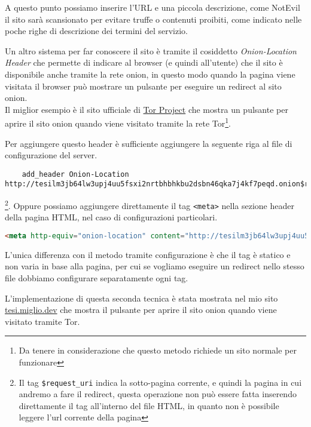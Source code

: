 A questo punto possiamo inserire l'URL e una piccola descrizione, come NotEvil il sito sarà scansionato per evitare truffe o contenuti proibiti, come indicato nelle poche righe di descrizione dei termini del servizio. \\

\newpage
Un altro sistema per far conoscere il sito è tramite il cosiddetto \emph{Onion-Location Header} che permette di indicare al browser (e quindi all'utente) che il sito è disponibile anche tramite la rete onion, in questo modo quando la pagina viene visitata il browser può mostrare un pulsante per eseguire un redirect al sito onion. \\
Il miglior esempio è il sito ufficiale di \href{www.torproject.org}{Tor Project} che mostra un pulsante per aprire il sito onion quando viene visitato tramite la rete Tor\footnote{Da tenere in considerazione che questo metodo richiede un sito normale per funzionare}. \\

Per aggiungere questo header è sufficiente aggiungere la seguente riga al file di configurazione del server.
\begin{lstlisting}
    add_header Onion-Location http://tesilm3jb64lw3upj4uu5fsxi2nrtbhbhkbu2dsbn46qka7j4kf7peqd.onion$request_uri;
\end{lstlisting}
\footnote{Il tag \lstinline{$request_uri} indica la sotto-pagina corrente, e quindi la pagina in cui andremo a fare il redirect, questa operazione non può essere fatta inserendo direttamente il tag all'interno del file HTML, in quanto non è possibile leggere l'url corrente della pagina}.
Oppure possiamo aggiungere direttamente il tag \lstinline{<meta>} nella sezione header della pagina HTML, nel caso di configurazioni particolari.
\begin{lstlisting}[language=HTML]
    <meta http-equiv="onion-location" content="http://tesilm3jb64lw3upj4uu5fsxi2nrtbhbhkbu2dsbn46qka7j4kf7peqd.onion" />
\end{lstlisting}
L'unica differenza con il metodo tramite configurazione è che il tag è statico e non varia in base alla pagina, per cui se vogliamo eseguire un redirect nello stesso file dobbiamo configurare separatamente ogni tag. 

L'implementazione di questa seconda tecnica è stata mostrata nel mio sito \href{https://tesi.miglio.dev}{tesi.miglio.dev} che mostra il pulsante per aprire il sito onion quando viene visitato tramite Tor. \\
\cite{OnionLocationHeader}
